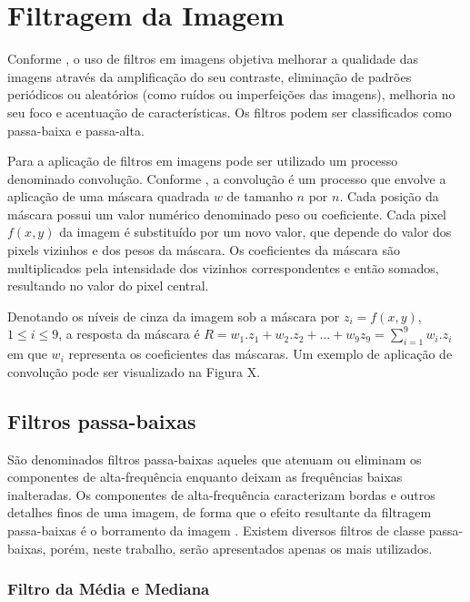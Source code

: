 \documentclass[12pt,oneside,a4paper,english,french,spanish,brazil,]{abntex2}
\begin{document}
\section{Filtragem da Imagem}

Conforme \citet{conci:2003}, o uso de filtros em imagens objetiva melhorar a qualidade das imagens através da amplificação do seu contraste, eliminação de padrões periódicos ou aleatórios (como ruídos ou imperfeições das imagens), melhoria no seu foco e acentuação de características. Os filtros podem ser classificados como passa-baixa e passa-alta.
	
Para a aplicação de filtros em imagens pode ser utilizado um processo denominado convolução. Conforme \cite{pedrini:2008}, a convolução é um processo que envolve a aplicação de uma máscara quadrada \(w\) de tamanho \(n\) por \(n\). Cada posição da máscara possui um valor numérico denominado peso ou coeficiente. Cada pixel \(f(x,y)\) da imagem é substituído por um novo valor, que depende do valor dos pixels vizinhos e dos pesos da máscara. Os coeficientes da máscara são multiplicados pela intensidade dos vizinhos correspondentes e então somados, resultando no valor do pixel central.


Denotando os níveis de cinza da imagem sob a máscara por \(z_i=f(x,y)\), \(1\leq i\leq 9\), a resposta da máscara é \(R=w_1.z_1+w_2.z_2+...+w_9z_9 = \sum_{i=1}^{9}w_i.z_i\) em que \(w_i\) representa os coeficientes das máscaras. Um exemplo de aplicação de convolução pode ser visualizado na Figura X.
	

\subsection{Filtros passa-baixas}

São denominados filtros passa-baixas aqueles que atenuam ou eliminam os componentes de alta-frequência enquanto deixam as frequências baixas inalteradas. Os componentes de alta-frequência caracterizam bordas e outros detalhes finos de uma imagem, de forma que o efeito resultante da filtragem passa-baixas é o borramento da imagem \cite{gonzalez:2012}. Existem diversos filtros de classe passa-baixas, porém, neste trabalho, serão apresentados apenas os mais utilizados.

\subsubsection{Filtro da Média e Mediana}
\end{document}
